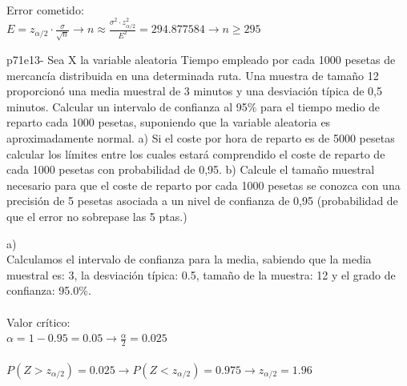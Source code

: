 \documentclass[spanish, 11pt]{exam}
\begin{document}
\begin{questions}
\begin{solution}
     \\
    Error cometido: \\ $E=z_{\alpha/2}\cdot \frac{\sigma}{\sqrt{n}} \to n \approx \frac{\sigma^2 \cdot z_{\alpha / 2}^2}{E^2}=294.877584 \to n \geq295$ \\    \end{solution}\question p71e13- Sea X la variable aleatoria Tiempo empleado por cada 1000 pesetas de mercancía distribuida en una
determinada ruta. Una muestra de tamaño 12 proporcionó una media muestral de 3 minutos y una desviación
típica de 0,5 minutos. Calcular un intervalo de confianza al 95\% para el tiempo medio de reparto cada 1000
pesetas, suponiendo que la variable aleatoria es aproximadamente normal.
a) Si el coste por hora de reparto es de 5000 pesetas calcular los límites entre los cuales estará
comprendido el coste de reparto de cada 1000 pesetas con probabilidad de 0,95.
b) Calcule el tamaño muestral necesario para que el coste de reparto por cada 1000 pesetas se conozca
con una precisión de 5 pesetas asociada a un nivel de confianza de 0,95 (probabilidad de que el error
no sobrepase las 5 ptas.) \begin{solution}   a) \\Calculamos el intervalo de confianza para la media, sabiendo que la media muestral es: 3, la desviación típica: 0.5, tamaño de la muestra: 12 y el grado de confianza: 95.0\%. \\ \\ Valor crítico: \\ $\alpha=1-0.95=0.05\to \frac{\alpha}{2}=0.025$ \\ \\ $P(Z>z_{\alpha/2})=0.025\to P(Z<z_{\alpha/2})=0.975 \to z_{\alpha/2} =1.96$ \\ 

\end{solution}
\end{questions}
\end{document}

